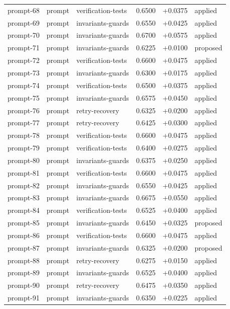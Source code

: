 \begin{center}
\begin{longtable}{llp{5.2cm}rrl}
prompt-68 & prompt & verification-tests & 0.6500 & +0.0375 & applied \\
prompt-69 & prompt & invariants-guards & 0.6550 & +0.0425 & applied \\
prompt-70 & prompt & invariants-guards & 0.6700 & +0.0575 & applied \\
prompt-71 & prompt & invariants-guards & 0.6225 & +0.0100 & proposed \\
prompt-72 & prompt & verification-tests & 0.6600 & +0.0475 & applied \\
prompt-73 & prompt & invariants-guards & 0.6300 & +0.0175 & applied \\
prompt-74 & prompt & verification-tests & 0.6500 & +0.0375 & applied \\
prompt-75 & prompt & invariants-guards & 0.6575 & +0.0450 & applied \\
prompt-76 & prompt & retry-recovery & 0.6325 & +0.0200 & applied \\
prompt-77 & prompt & retry-recovery & 0.6425 & +0.0300 & applied \\
prompt-78 & prompt & verification-tests & 0.6600 & +0.0475 & applied \\
prompt-79 & prompt & verification-tests & 0.6400 & +0.0275 & applied \\
prompt-80 & prompt & invariants-guards & 0.6375 & +0.0250 & applied \\
prompt-81 & prompt & verification-tests & 0.6600 & +0.0475 & applied \\
prompt-82 & prompt & invariants-guards & 0.6550 & +0.0425 & applied \\
prompt-83 & prompt & invariants-guards & 0.6675 & +0.0550 & applied \\
prompt-84 & prompt & verification-tests & 0.6525 & +0.0400 & applied \\
prompt-85 & prompt & invariants-guards & 0.6450 & +0.0325 & proposed \\
prompt-86 & prompt & verification-tests & 0.6600 & +0.0475 & applied \\
prompt-87 & prompt & invariants-guards & 0.6325 & +0.0200 & proposed \\
prompt-88 & prompt & retry-recovery & 0.6275 & +0.0150 & applied \\
prompt-89 & prompt & invariants-guards & 0.6525 & +0.0400 & applied \\
prompt-90 & prompt & retry-recovery & 0.6475 & +0.0350 & applied \\
prompt-91 & prompt & invariants-guards & 0.6350 & +0.0225 & applied \\

\end{longtable}
\end{center}
